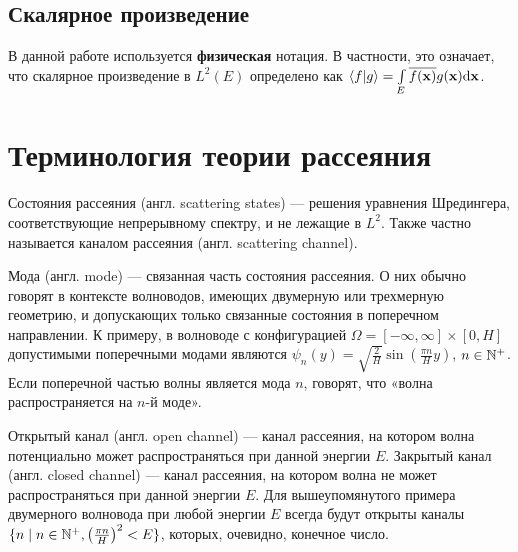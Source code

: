 \subsection{Скалярное произведение}

В данной работе используется \textbf{физическая} нотация. В частности, это означает, что скалярное произведение в $L^2(E)$ определено как $\ip{f}{g} = \int\limits_E \cconj{f(\vb{x})} g(\vb{x}) \dd \vb{x}$.

\section{Терминология теории рассеяния}
Состояния рассеяния (англ. scattering states) — решения уравнения Шредингера, соответствующие непрерывному спектру, и не лежащие в $L^2$. Также частно называется каналом рассеяния (англ. scattering channel).

Мода (англ. mode) — связанная часть состояния рассеяния. О них обычно говорят в контексте волноводов, имеющих двумерную или трехмерную геометрию, и допускающих только связанные состояния в поперечном направлении. К примеру, в волноводе с конфигурацией $\Omega = [-\infty, \infty] \times [0, H]$ допустимыми поперечными модами являются $\psi_n(y) = \sqrt{\frac{2}{H}} \sin(\frac{\pi n}{H} y)$, $n \in \mathbb{N}^+$. Если поперечной частью волны является мода $n$, говорят, что «волна распространяется на $n$-й моде».

Открытый канал (англ. open channel) — канал рассеяния, на котором волна потенциально может распространяться при данной энергии $E$. Закрытый канал (англ. closed channel) — канал рассеяния, на котором волна не может распространяться при данной энергии $E$. Для вышеупомянутого примера двумерного волновода при любой энергии $E$ всегда будут открыты каналы $\{n \mid n \in \mathbb{N}^+, \left(\frac{\pi n}{H}\right)^2 < E \}$, которых, очевидно, конечное число.